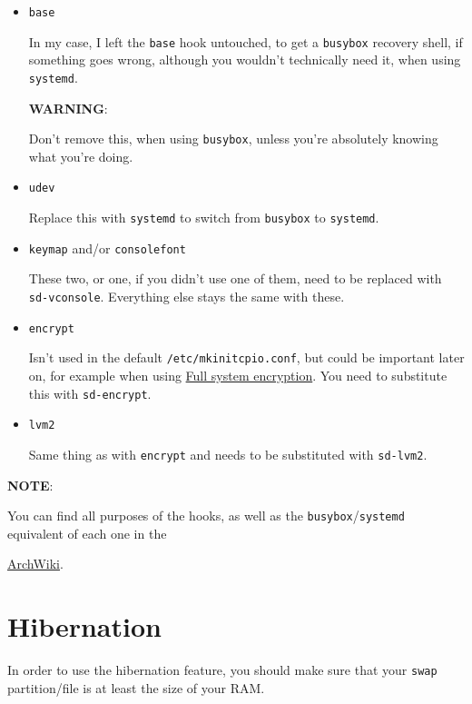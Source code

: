 \documentclass[9pt]{report}
\newcommand{\admonition}[2]{\textbf{#1}: {#2}}
\begin{document}
\begin{itemize}

\item \texttt{base}

In my case, I left the \texttt{base} hook untouched, to get a \texttt{busybox} recovery shell, if something goes wrong, although you wouldn’t technically need it, when using \texttt{systemd}.


\admonition{WARNING}{Don’t remove this, when using \texttt{busybox}, unless you’re absolutely knowing what you’re doing.

}\item \texttt{udev}

Replace this with \texttt{systemd} to switch from \texttt{busybox} to \texttt{systemd}.

\item \texttt{keymap} and/or \texttt{consolefont}

These two, or one, if you didn’t use one of them, need to be replaced with \texttt{sd-vconsole}.
Everything else stays the same with these.

\item \texttt{encrypt}

Isn’t used in the default \texttt{/etc/mkinitcpio.conf}, but could be important later on, for example when using \hyperlink{full-system-encryption}{Full system encryption}.
You need to substitute this with \texttt{sd-encrypt}.

\item \texttt{lvm2}

Same thing as with \texttt{encrypt} and needs to be substituted with \texttt{sd-lvm2}.

\end{itemize}


\admonition{NOTE}{You can find all purposes of the hooks, as well as the \texttt{busybox}/\texttt{systemd} equivalent of each one in the

}
\href{https://wiki.archlinux.org/index.php/Mkinitcpio#Common_hooks}{ArchWiki}.


\vfill\eject

\hypertarget{x-hibernation}{\section{Hibernation}}
In order to use the hibernation feature, you should make sure that your \texttt{swap} partition/file is at least the size of your RAM.
\end{document}
